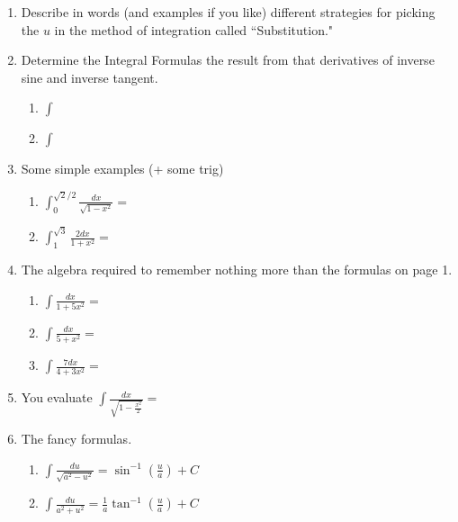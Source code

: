 \documentclass[11pt,fleqn]{article}
\def\ds{\displaystyle}
\begin{document}
\vspace*{-0.7in}

\begin{center}
  \Large{}
  \end{center}
\begin{enumerate}
\item Describe in words (and examples if you like) different strategies for picking the $u$ in the method of integration called ``Substitution."
\vspace{1in}
\item Determine the Integral Formulas the result from that derivatives of inverse sine and inverse tangent. 	\begin{multicols}{2}
	\begin{enumerate}
	\item $\ds{\int }$
	\columnbreak
	\item $\ds{\int }$	
	\end{enumerate}
	\end{multicols}
	\vspace{.2in}
\item Some simple examples  (+ some trig)
	\begin{enumerate}
	\item $\ds{\int_0^{\sqrt{2}/2} \frac{dx}{\sqrt{1-x^2}}}=$
	\vfill
	\item $\ds{\int_1^{\sqrt{3}} \frac{2dx}{1+x^2}}=$
	\vfill
	\end{enumerate}
\newpage
\item The algebra required to remember nothing more than the formulas on page 1.
	\begin{enumerate}
	\item $\ds{\int \frac{dx}{1+5x^2}}=$
	\vfill
	\item $\ds{\int \frac{dx}{5+x^2}}=$
	\vfill
	\item $\ds{\int \frac{7dx}{4+3x^2}}=$
	\vfill
	\end{enumerate}
\item You evaluate $\ds{\int \frac{dx}{\sqrt{1-\frac{x^2}{2}}}}=$
	\vfill

\item The fancy formulas.
	\begin{multicols}{2}
	\begin{enumerate}
	
	\item $\ds{\int \frac{du}{ \sqrt{a^2-u^2}}= \sin^{-1}\left( \frac{u}{a}\right) +C}$
	\columnbreak
	\item $\ds{\int \frac{du}{{a^2+u^2}}}=\frac{1}{a}\tan^{-1}\left( \frac{u}{a}\right) +C$	
	\end{enumerate}
	\end{multicols}

	
\end{enumerate}
\end{document}
